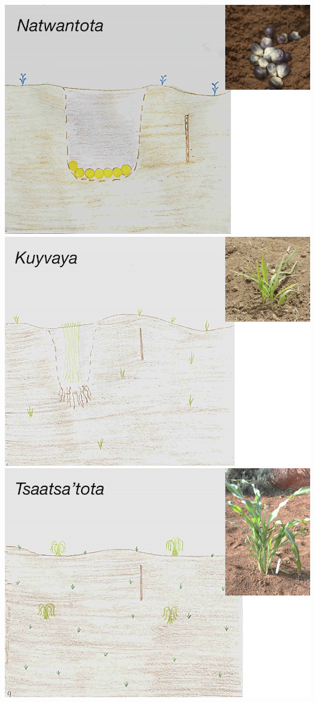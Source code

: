 \documentclass[12pt,]{article}
\begin{document}
\includegraphics{./images/hopi_growth/1_nawantota.jpg}
\includegraphics{./images/hopi_growth/2_kuyvaya.jpg}
\includegraphics{./images/hopi_growth/3_tsaatsatota.jpg}
\end{document}
